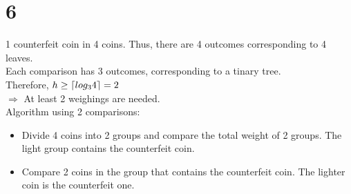 \documentclass[12pt]{article}
\DeclarePairedDelimiter\ceil{\lceil}{\rceil}
\begin{document}
    \section*{6}
      1 counterfeit coin in 4 coins. Thus, there are 4 outcomes corresponding to 4 leaves.\\
      Each comparison has 3 outcomes, corresponding to a tinary tree.\\
      Therefore, \(h \geq \ceil*{log_34} = 2\)\\
      \(\Rightarrow\) At least 2 weighings are needed.\\
      Algorithm using 2 comparisons: 
      \begin{itemize}
        \item Divide 4 coins into 2 groups and compare the total weight of 2 groups. The light group contains the counterfeit coin.
        \item Compare 2 coins in the group that contains the counterfeit coin. The lighter coin is the counterfeit one.
      \end{itemize}  
\end{document}
